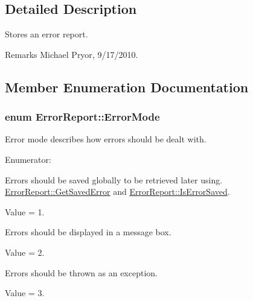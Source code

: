 \subsection{Detailed Description}
Stores an error report. \begin{DoxyRemark}{Remarks}
Michael Pryor, 9/17/2010. 
\end{DoxyRemark}


\subsection{Member Enumeration Documentation}
\hypertarget{class_error_report_ab70777b4cf64240281ddd4217664f683}{
\subsubsection[{ErrorMode}]{\setlength{\rightskip}{0pt plus 5cm}enum {\bf ErrorReport::ErrorMode}}}
\label{class_error_report_ab70777b4cf64240281ddd4217664f683}


Error mode describes how errors should be dealt with. 

\begin{Desc}
\item[Enumerator: ]\par
\begin{description}
\item[{\em 
\hypertarget{class_error_report_ab70777b4cf64240281ddd4217664f683a8ab8b12d7e1c3dcc392f15390ca1bb92}{
EM\_\-SAVE}
\label{class_error_report_ab70777b4cf64240281ddd4217664f683a8ab8b12d7e1c3dcc392f15390ca1bb92}
}]Errors should be saved globally to be retrieved later using. \hyperlink{class_error_report_ae60447056cab3846d9d38d3674001567}{ErrorReport::GetSavedError} and \hyperlink{class_error_report_a60d5623dd21ced2f3a41055aab6cae06}{ErrorReport::IsErrorSaved}.\par
 Value = 1. \item[{\em 
\hypertarget{class_error_report_ab70777b4cf64240281ddd4217664f683ac068e8e545daa37db2310c4123d457b7}{
EM\_\-MESSAGE\_\-BOX}
\label{class_error_report_ab70777b4cf64240281ddd4217664f683ac068e8e545daa37db2310c4123d457b7}
}]Errors should be displayed in a message box.\par
 Value = 2. \item[{\em 
\hypertarget{class_error_report_ab70777b4cf64240281ddd4217664f683a0f7be56a26a11b9c4f1fe287f952375f}{
EM\_\-EXCEPTION}
\label{class_error_report_ab70777b4cf64240281ddd4217664f683a0f7be56a26a11b9c4f1fe287f952375f}
}]Errors should be thrown as an exception. \par
 Value = 3. \end{description}
\end{Desc}




